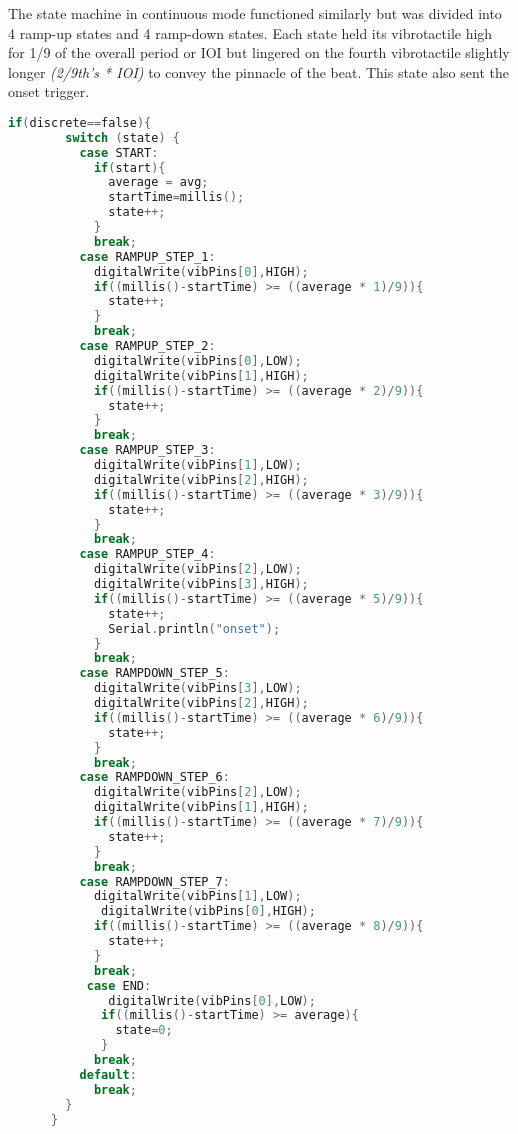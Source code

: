 The state machine in continuous mode functioned similarly but was divided into 4 ramp-up states and 4 ramp-down states. Each state held its vibrotactile high for 1/9 of the overall period or IOI but lingered on the fourth vibrotactile slightly longer \textit{(2/9th's * IOI)} to convey the pinnacle of the beat. This state also sent the onset trigger.

\begin{lstlisting}[language=C]
    if(discrete==false){
        switch (state) {
          case START:
            if(start){
              average = avg;
              startTime=millis(); 
              state++;
            }
            break;
          case RAMPUP_STEP_1:
            digitalWrite(vibPins[0],HIGH);
            if((millis()-startTime) >= ((average * 1)/9)){
              state++;
            }
            break;
          case RAMPUP_STEP_2:
            digitalWrite(vibPins[0],LOW);
            digitalWrite(vibPins[1],HIGH);
            if((millis()-startTime) >= ((average * 2)/9)){
              state++;
            }
            break;
          case RAMPUP_STEP_3:
            digitalWrite(vibPins[1],LOW);
            digitalWrite(vibPins[2],HIGH);
            if((millis()-startTime) >= ((average * 3)/9)){
              state++;
            }
            break;
          case RAMPUP_STEP_4:
            digitalWrite(vibPins[2],LOW);
            digitalWrite(vibPins[3],HIGH);
            if((millis()-startTime) >= ((average * 5)/9)){
              state++;
              Serial.println("onset");
            }
            break;
          case RAMPDOWN_STEP_5:
            digitalWrite(vibPins[3],LOW);
            digitalWrite(vibPins[2],HIGH);
            if((millis()-startTime) >= ((average * 6)/9)){
              state++;
            }
            break;
          case RAMPDOWN_STEP_6:
            digitalWrite(vibPins[2],LOW);
            digitalWrite(vibPins[1],HIGH);
            if((millis()-startTime) >= ((average * 7)/9)){
              state++;
            }
            break;
          case RAMPDOWN_STEP_7:
            digitalWrite(vibPins[1],LOW);
             digitalWrite(vibPins[0],HIGH);
            if((millis()-startTime) >= ((average * 8)/9)){
              state++;
            }
            break;
           case END:
              digitalWrite(vibPins[0],LOW);
             if((millis()-startTime) >= average){
               state=0; 
             }
            break;
          default:
            break;
        }
      }
\end{lstlisting}


